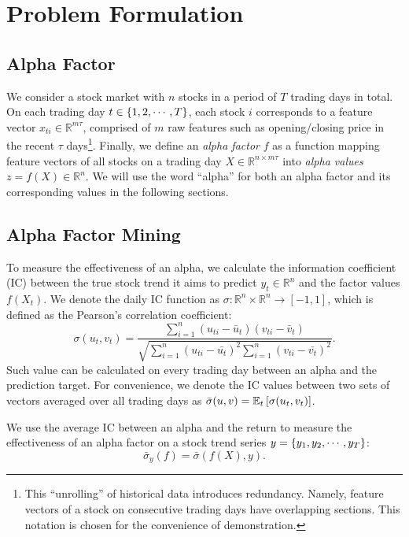 \section{Problem Formulation}\label{sec:formulation}

\subsection{Alpha Factor}

We consider a stock market with $n$ stocks in a period of $T$ trading days in total. On each trading day $t \in \left\lbrace 1, 2, \cdots, T\right\rbrace$, each stock $i$ corresponds to a feature vector $x_{ti} \in \mathbb{R}^{m\tau}$, comprised of $m$ raw features such as opening/closing price in the recent $\tau$ days\footnote{This ``unrolling'' of historical data introduces redundancy. Namely, feature vectors of a stock on consecutive trading days have overlapping sections. This notation is chosen for the convenience of demonstration.}. Finally, we define an \emph{alpha factor} $f$ as a function mapping feature vectors of all stocks on a trading day $X \in \mathbb{R}^{n\times m\tau}$ into \emph{alpha values} $z = f(X) \in \mathbb{R}^n$. We will use the word ``alpha'' for both an alpha factor and its corresponding values in the following sections.

\subsection{Alpha Factor Mining}

To measure the effectiveness of an alpha, we calculate the information coefficient (IC) between the true stock trend it aims to predict $y_t \in \mathbb{R}^n$ and the factor values $f(X_t)$. We denote the daily IC function as $\sigma: \mathbb{R}^{n} \times \mathbb{R}^{n} \to [-1, 1]$, which is defined as the Pearson's correlation coefficient:
\begin{equation}
    \sigma(u_t, v_t) = \frac{\sum_{i=1}^{n} (u_{ti} - \bar{u}_t)(v_{ti} - \bar{v}_t)}{\sqrt{\sum_{i=1}^{n} (u_{ti} - \bar{u_t})^2 \sum_{i=1}^{n} (v_{ti} - \bar{v_t})^2}}.
    \label{eq:pearson}
\end{equation}
Such value can be calculated on every trading day between an alpha and the prediction target. For convenience, we denote the IC values between two sets of vectors averaged over all trading days as $\bar{\sigma}(u, v) = \mathbb{E}_{t}\left[\sigma(u_t, v_t)\right]$.

We use the average IC between an alpha and the return to measure the effectiveness of an alpha factor on a stock trend series $y = \left\lbrace y_1, y_2, \cdots, y_T\right\rbrace$:
\begin{equation}
    \bar{\sigma}_y(f) = \bar{\sigma}(f(X), y).
\end{equation}

